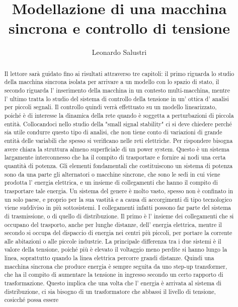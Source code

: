 \documentclass[Lau,noexaminfo]{sapthesis}
\title{Modellazione di una macchina sincrona e controllo di tensione}
\author{Leonardo Salustri}
\begin{document}
	\frontmatter
	
	
	\maketitle
	\begin{abstract}
	Il lettore sarà guidato fino ai risultati attraverso tre capitoli: il primo riguarda lo studio della macchina sincrona isolata per arrivare a un modello con lo spazio di stato, il
	secondo riguarda l' inserimento della macchina in un contesto multi-macchina, mentre l' ultimo tratta lo studio del sistema di controllo della tensione in un' ottica d' analisi per piccoli segnali.
	Il controllo quindi verrà effettuato su un modello linearizzato, poiché è di interesse la dinamica della rete quando è soggetta a perturbazioni di piccola entità.
	Collocandoci nello studio della "small signal stability" ci si deve chiedere perché sia utile condurre questo tipo di analisi, che non tiene conto di variazioni di grande entità delle variabili che spesso si verificano nelle reti elettriche. Per rispondere bisogna avere chiara la struttura almeno superficiale di un power system.
	Questo è un sistema largamente interconnesso che ha il compito di trasportare e fornire ai nodi una certa quantità di potenza. Gli elementi fondamentali che costituiscono
	un sistema di potenza sono da una parte gli alternatori o macchine sincrone, che sono le sedi in cui viene prodotta l' energia elettrica, e un insieme di collegamenti
	che hanno il compito di trasportare tale energia. Un sistema del genere è molto vasto, spesso non è confinato in un solo paese, e proprio per la sua vastità e a causa di
	accorgimenti di tipo tecnologico viene suddiviso in più sottosistemi. I collegamenti infatti possono far parte del sistema di trasmissione,
	o di quello di distribuzione. Il primo è l' insieme dei collegamenti che si occupano del trasporto, anche per lunghe distanze, dell' energia elettrica, mentre il secondo
	si occupa del dispaccio di energia nei centri più piccoli, per portare la corrente alle abitazioni o alle piccole industrie. La principale differenza tra i due sistemi
	è il valore della tensione, poiché più è elevato il voltaggio meno perdite si hanno lungo la linea, soprattutto quando la linea elettrica percorre grandi distanze. Quindi una macchina
	sincrona che produce energia è sempre seguita da uno step-up transformer, che ha il compito di aumentare la tensione in ingresso secondo un certo rapporto di trasformazione.
	Questo implica che una volta che l' energia è arrivata al sistema di distribuzione, ci sia bisogno di un trasformatore che abbassi il livello di tensione, cosicché possa essere

\end{abstract}
\end{document}
